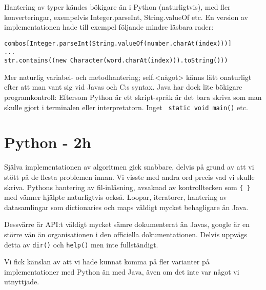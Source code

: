 \documentclass[a4paper, twoside, 11pt]{article}
\begin{document}
Hantering av typer kändes bökigare än i Python (naturligtvis), med fler konverteringar, exempelvis Integer.parseInt, String.valueOf etc. En version av implementationen hade till exempel följande mindre läsbara rader:\\
\begin{verbatim}
combos[Integer.parseInt(String.valueOf(number.charAt(index)))]
...
str.contains((new Character(word.charAt(index))).toString()))
\end{verbatim}

Mer naturlig variabel- och metodhantering; self.<något> känns lätt onaturligt efter att man vant sig vid Javas och C:s syntax. Java har dock lite bökigare programkontroll: Eftersom Python är ett skript-språk är det bara skriva som man skulle gjort i terminalen eller interpretatorn. Inget \verb| static void main()| etc.

\section{Python - 2h}

Själva implementationen av algoritmen gick snabbare, delvis på grund av att vi stött på de flesta problemen innan. Vi visste med andra ord precis vad vi skulle skriva. Pythons hantering av fil-inläsning, avsaknad av kontrolltecken som \verb|{ }| med vänner hjälpte naturligtvis också. Loopar, iteratorer, hantering av datasamlingar som dictionaries och maps väldigt mycket behagligare än Java.

Dessvärre är API:t väldigt mycket sämre dokumenterat än Javas, google är en större vän än organisationen i den officiella dokumentationen. Delvis uppvägs detta av \verb|dir()| och \verb|help()| men inte fullständigt.

Vi fick känslan av att vi hade kunnat komma på fler varianter på implementationer med Python än med Java, även om det inte var något vi utnyttjade.
\end{document}
